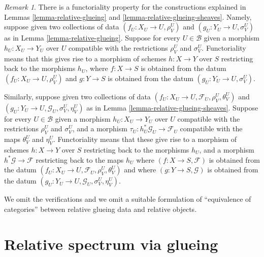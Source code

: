 \documentclass{stacks-project}
\theoremstyle{plain}
\theoremstyle{definition}
\theoremstyle{remark}
\newtheorem{remark}[subsection]{Remark}
\numberwithin{equation}{subsection}
\begin{document}
\begin{remark}
\label{remark-relative-glueing-functorial}
There is a functoriality property for the constructions explained
in Lemmas \ref{lemma-relative-glueing} and
\ref{lemma-relative-glueing-sheaves}. Namely, suppose given
two collections of data $(f_U : X_U \to U, \rho^U_V)$ and
$(g_U : Y_U \to U, \sigma^U_V)$ as in Lemma \ref{lemma-relative-glueing}.
Suppose for every $U \in \mathcal{B}$ given
a morphism $h_U : X_U \to Y_U$ over $U$ compatible with
the restrictions $\rho^U_V$ and $\sigma^U_V$. Functoriality
means that this gives rise to a morphism of schemes
$h : X \to Y$ over $S$ restricting back to the morphisms $h_U$,
where $f : X \to S$ is obtained from
the datum $(f_U : X_U \to U, \rho^U_V)$ and $g : Y \to S$
is obtained from the datum $(g_U : Y_U \to U, \sigma^U_V)$.

\medskip\noindent
Similarly, suppose given
two collections of data
$(f_U : X_U \to U, \mathcal{F}_U, \rho^U_V, \theta^U_V)$ and
$(g_U : Y_U \to U, \mathcal{G}_U, \sigma^U_V, \eta^U_V)$
as in Lemma \ref{lemma-relative-glueing-sheaves}.
Suppose for every $U \in \mathcal{B}$ given
a morphism $h_U : X_U \to Y_U$ over $U$ compatible with
the restrictions $\rho^U_V$ and $\sigma^U_V$, and a morphism
$\tau_U : h_U^*\mathcal{G}_U \to \mathcal{F}_U$ compatible with
the maps $\theta^U_V$ and $\eta^U_V$. Functoriality
means that these give rise to a morphism of schemes
$h : X \to Y$ over $S$ restricting back to the morphisms $h_U$,
and a morphism $h^*\mathcal{G} \to \mathcal{F}$ restricting back
to the maps $h_U$
where $(f : X \to S, \mathcal{F})$ is obtained from the datum
$(f_U : X_U \to U, \mathcal{F}_U, \rho^U_V, \theta^U_V)$ and
where $(g : Y \to S, \mathcal{G})$ is obtained from the datum
$(g_U : Y_U \to U, \mathcal{G}_U, \sigma^U_V, \eta^U_V)$.

\medskip\noindent
We omit the verifications and we omit a suitable formulation of
``equivalence of categories'' between relative glueing data
and relative objects.
\end{remark}















\section{Relative spectrum via glueing}
\label{section-spec-via-glueing}
\end{document}
